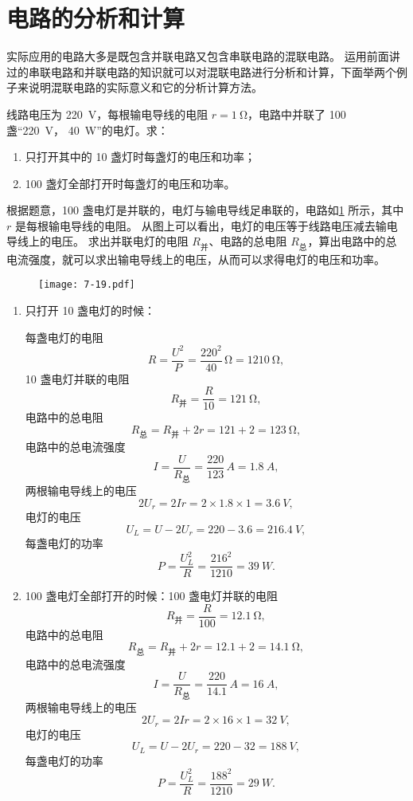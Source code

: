 \section{电路的分析和计算}
实际应用的电路大多是既包含并联电路又包含串联电路的混联电路。
运用前面讲过的串联电路和并联电路的知识就可以对混联电路进行分析和计算，下面举两个例子来说明混联电路的实际意义和它的分析计算方法。

\begin{example}
线路电压为 \qty{220}{V}，每根输电导线的电阻 $r=\qty{1}{\ohm}$，电路中并联了 100 盏“\qty{220}{V}， \qty{40}{W}”的电灯。求：
\begin{enumerate}
  \item 只打开其中的 10 盏灯时每盏灯的电压和功率；
  \item 100 盏灯全部打开时每盏灯的电压和功率。
\end{enumerate}
\end{example}

\begin{solution}
根据题意，100 盏电灯是并联的，电灯与输电导线足串联的，电路如\cref{fig:7-19} 所示，其中 $r$ 是每根输电导线的电阻。
从图上可以看出，电灯的电压等于线路电压减去输电导线上的电压。
求出并联电灯的电阻 $R_{\text{并}}$、电路的总电阻 $R_{\text{总}}$，算出电路中的总电流强度，就可以求出输电导线上的电压，从而可以求得电灯的电压和功率。
\begin{figure}
  \texttt{[image: 7-19.pdf]}
  \caption{}\label{fig:7-19}
\end{figure}	
\begin{enumerate}
  \item 只打开 10 盏电灯的时候：

  每盏电灯的电阻
  \[R=\frac{U^2}{P}=\frac{220^2}{40}\,\unit{\ohm}=\qty{1210}{\ohm},\]
  10 盏电灯并联的电阻
  \[R_{\text{并}}=\frac{R}{10}=\qty{121}{\ohm},\]
  电路中的总电阻
  \[R_{\text{总}}=R_{\text{并}}+2r=121+2=\qty{123}{\ohm},\]
  电路中的总电流强度
  \[I=\frac{U}{R_{\text{总}}}=\frac{220}{123} \,\unit{A}=\qty{1.8}{A},\]
  两根输电导线上的电压
  \[2U_r=2Ir =2\times 1.8\times 1=\qty{3.6}{V},\]
  电灯的电压
  \[U_L=U-2U_r=220-3.6=\qty{216.4}{V},\]
  每盏电灯的功率
  \[P=\frac{U^2_L}{R}=\frac{216^2}{1210}=\qty{39}{W}.\]

  \item 100 盏电灯全部打开的时候：100 盏电灯并联的电阻
  \[R_{\text{并}}=\frac{R}{100}=\qty{12.1}{\ohm},\]
  电路中的总电阻
  \[R_{\text{总}}=R_{\text{并}}+2r=12.1+2=\qty{14.1}{\ohm},\]
  电路中的总电流强度
  \[I=\frac{U}{R_{\text{总}}}=\frac{220}{14.1} \,\unit{A}=\qty{16}{A},\]
  两根输电导线上的电压
  \[2U_r=2Ir =2\times 16\times 1=\qty{32}{V},\]
  电灯的电压
  \[U_L=U-2U_r=220-32=\qty{188}{V},\]
  每盏电灯的功率
  \[P=\frac{U^2_L}{R}=\frac{188^2}{1210}=\qty{29}{W}.\]
\end{enumerate}
\end{solution}

